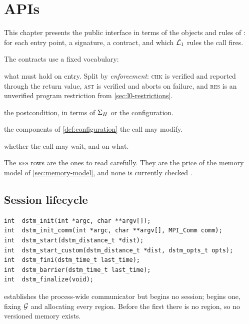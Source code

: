 \chapter{APIs}
\label{ch:apis}

This chapter presents the public interface in terms of the objects and rules
of : for each entry point, a
signature, a contract, and which $\mathcal{L}_1$ rules the call fires.

The contracts use a fixed vocabulary:

\begin{description}[leftmargin=1.9cm,style=nextline,font=\normalfont\bfseries]
  \item[Requires] what must hold on entry. Split by \emph{enforcement}:
    \textsc{chk} is verified and reported through the return value,
    \textsc{ast} is verified and aborts on failure, and \textsc{res} is an
    unverified program restriction from \cref{sec:l0-restrictions}.
  \item[Ensures] the postcondition, in terms of $\Sigma_{H}$ or the
    configuration.
  \item[Frame] the components of \cref{def:configuration} the call may
    modify.
  \item[Blocks] whether the call may wait, and on what.
\end{description}

The \textsc{res} rows are the ones to read carefully. They are the price of
the memory model of \cref{sec:memory-model}, and none is currently checked
.

\section{Session lifecycle}
\label{sec:api-session}

\begin{lstlisting}
int  dstm_init(int *argc, char **argv[]);
int  dstm_init_comm(int *argc, char **argv[], MPI_Comm comm);
int  dstm_start(dstm_distance_t *dist);
int  dstm_start_custom(dstm_distance_t *dist, dstm_opts_t opts);
int  dstm_fini(dstm_time_t last_time);
int  dstm_barrier(dstm_time_t last_time);
int  dstm_finalize(void);
\end{lstlisting}

 establishes the process-wide communicator but begins no
\gls{session};  begins one, fixing $\mathcal{G}$ and allocating
every region. Before the first  there is no region, so no
versioned memory exists.

